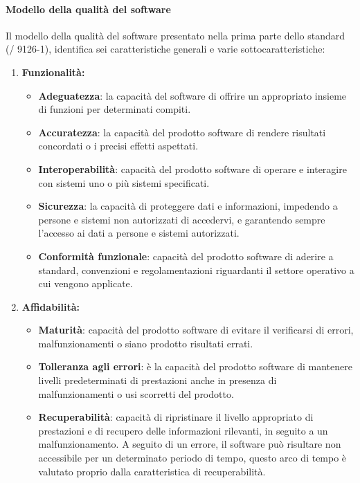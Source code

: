   \paragraph{Modello della qualità del software}
  Il modello della qualità del software presentato nella prima parte dello standard (/ 9126-1), identifica sei caratteristiche generali e varie sottocaratteristiche:
  \begin{enumerate}
    \item \textbf{Funzionalità:}
    \begin{itemize}
        \item \textbf{Adeguatezza}: la capacità del software di offrire un appropriato insieme di funzioni per determinati compiti.
        \item \textbf{Accuratezza}: la capacità del prodotto software di rendere risultati concordati o i precisi effetti aspettati.
        \item \textbf{Interoperabilità}: capacità del prodotto software di operare e interagire con sistemi uno o più sistemi specificati.
        \item \textbf{Sicurezza}: la capacità di proteggere dati e informazioni, impedendo a persone e sistemi non autorizzati di accedervi, e garantendo sempre l'accesso ai dati a persone e sistemi autorizzati.
        \item \textbf{Conformità funzionale}: capacità del prodotto software di aderire a standard, convenzioni e regolamentazioni riguardanti il settore operativo a cui vengono applicate.
    \end{itemize}
    \item \textbf{Affidabilità:}
    \begin{itemize}
      \item \textbf{Maturità}: capacità del prodotto software di evitare il verificarsi di errori, malfunzionamenti o siano prodotto risultati errati.
      \item \textbf{Tolleranza agli errori}: è la capacità del prodotto software di mantenere livelli predeterminati di prestazioni anche in presenza di malfunzionamenti o usi scorretti del prodotto.
      \item \textbf{Recuperabilità}: capacità di ripristinare il livello appropriato di prestazioni e di recupero delle informazioni rilevanti, in seguito a un malfunzionamento.
      A seguito di un errore, il software può risultare non accessibile per un determinato periodo di tempo, questo arco di tempo è valutato proprio dalla caratteristica di recuperabilità.

\end{itemize}
\end{enumerate}
